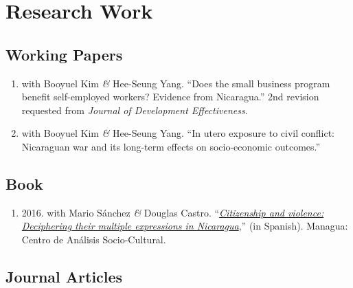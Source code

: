 \documentclass[a4paper, 10pt]{article}
\begin{document}
\section*{Research Work}

\subsection*{Working Papers}

\begin{enumerate}[leftmargin=10pt, label={}, itemindent=-10pt, nosep]
\item with Booyuel Kim \textit{\&} Hee-Seung Yang. ``Does the small business program benefit self-employed workers? Evidence from Nicaragua.'' 2nd revision requested from \textit{Journal of Development Effectiveness}.
\item with Booyuel Kim \textit{\&} Hee-Seung Yang. ``In utero exposure to civil conflict: Nicaraguan war and its long-term effects on socio-economic outcomes.''
\end{enumerate}

\subsection*{Book}

\begin{enumerate}[leftmargin=10pt, label={}, itemindent=-10pt, nosep]
\item 2016. with Mario Sánchez \textit{\&} Douglas Castro. ``\emph{\href{http://biblioteca.clacso.edu.ar/Nicaragua/casc-uca/20150313124733/Ciudadania-y-violencia.pdf}{Citizenship and violence: Deciphering their multiple expressions in Nicaragua}},'' (in Spanish). Managua: Centro de Análisis Socio-Cultural.
\end{enumerate}

\subsection*{Journal Articles}
\end{document}
